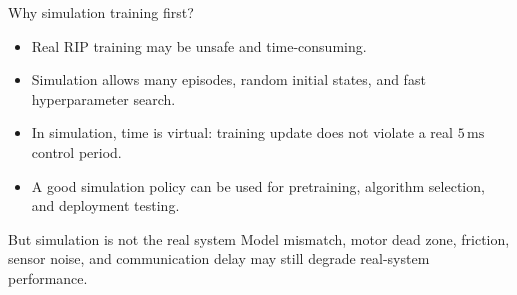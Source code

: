 \documentclass[aspectratio=169]{beamer}
\begin{document}
\begin{frame}{Why simulation training first?}

\begin{itemize}
    \item Real RIP training may be unsafe and time-consuming.
    \vspace{0.2cm}

    \item Simulation allows many episodes, random initial states, and fast hyperparameter search.
    \vspace{0.2cm}

    \item In simulation, time is virtual: training update does not violate a real \(5\,\mathrm{ms}\) control period.
    \vspace{0.2cm}

    \item A good simulation policy can be used for pretraining, algorithm selection, and deployment testing.
\end{itemize}

\vspace{0.2cm}

\begin{alertblock}{But simulation is not the real system}
\small
Model mismatch, motor dead zone, friction, sensor noise, and communication delay may still degrade real-system performance.
\end{alertblock}

\end{frame}
\end{document}
